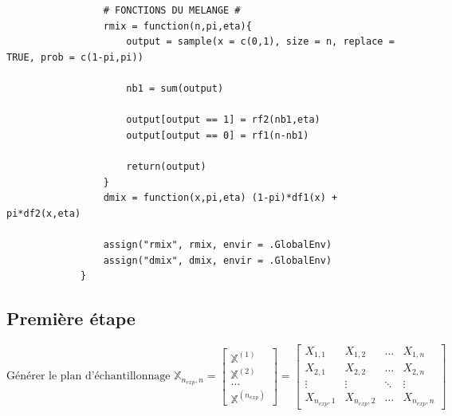 \documentclass{article}
\begin{document}
\begin{script}[h!]
\begin{verbatim}
                 # FONCTIONS DU MELANGE #
                 rmix = function(n,pi,eta){
                     output = sample(x = c(0,1), size = n, replace = TRUE, prob = c(1-pi,pi))
                     
                     nb1 = sum(output)
                     
                     output[output == 1] = rf2(nb1,eta)
                     output[output == 0] = rf1(n-nb1)
                     
                     return(output)
                 }
                 dmix = function(x,pi,eta) (1-pi)*df1(x) + pi*df2(x,eta)
 
                 assign("rmix", rmix, envir = .GlobalEnv)
                 assign("dmix", dmix, envir = .GlobalEnv)
             }
         \end{verbatim}
     \end{script}
 
\newpage
    \subsection{Première étape}


    $$ \mbox{Générer le plan d'échantillonnage } \mathbb{X}_{n_{exp},n} = 
    \begin{bmatrix}
        \mathbb{X}^{(1)} \\
        \mathbb{X}^{(2)} \\
        \ldots \\
        \mathbb{X}^{(n_{exp})}
    \end{bmatrix} =
    \begin{bmatrix}
        X_{1,1} & X_{1,2} & \ldots & X_{1,n} \\
        X_{2,1} & X_{2,2} & \ldots & X_{2,n} \\
        \vdots  & \vdots  & \ddots & \vdots  \\
        X_{n_{exp},1} & X_{n_{exp},2} & \ldots & X_{n_{exp},n}
    \end{bmatrix}$$
\end{document}
